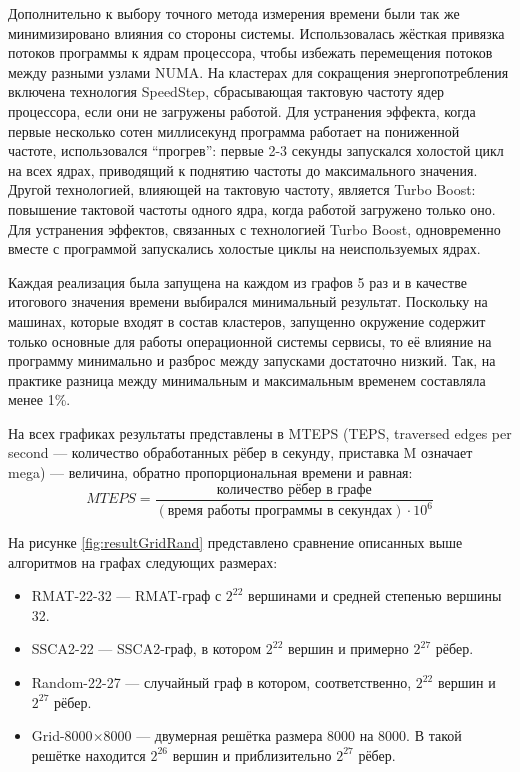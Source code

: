\documentclass[a4paper,12pt]{extarticle}
\begin{document}
Дополнительно к выбору точного метода измерения времени были так же минимизировано влияния со стороны системы. 
Использовалась жёсткая привязка потоков программы к ядрам процессора, чтобы избежать перемещения потоков между разными узлами NUMA.
На кластерах для сокращения энергопотребления включена технология SpeedStep, сбрасывающая тактовую частоту ядер процессора, если они не загружены работой. 
Для устранения эффекта, когда первые несколько сотен миллисекунд программа работает на пониженной частоте, использовался ``прогрев'': первые 2-3 секунды запускался холостой цикл на всех ядрах, приводящий к поднятию частоты до максимального значения.
Другой технологией, влияющей на тактовую частоту, является Turbo Boost: повышение тактовой частоты одного ядра, когда работой загружено только оно.
Для устранения эффектов, связанных с технологией Turbo Boost, одновременно вместе с программой запускались холостые циклы на неиспользуемых ядрах.

Каждая реализация была запущена на каждом из графов 5 раз и в качестве итогового значения времени выбирался минимальный результат.
Поскольку на машинах, которые входят в состав кластеров, запущенно окружение содержит только основные для работы операционной системы сервисы, то её влияние на программу минимально и разброс между запусками достаточно низкий.
Так, на практике разница между минимальным и максимальным временем составляла менее 1\%.

На всех графиках результаты представлены в MTEPS (TEPS, traversed edges per second --- количество обработанных рёбер в секунду, приставка M означает mega) --- величина, обратно пропорциональная времени и равная:
$$MTEPS = \frac{\texttt{количество рёбер в графе}}{(\texttt{время работы программы в секундах}) \cdot 10^6}$$

На рисунке \ref{fig:resultGridRand} представлено сравнение описанных выше алгоритмов на графах следующих размерах:
\begin{itemize}
    \item RMAT-22-32 --- RMAT-граф с $2^{22}$ вершинами и средней степенью вершины 32.
    \item SSCA2-22 --- SSCA2-граф, в котором $2^{22}$ вершин и примерно $2^{27}$ рёбер.
    \item Random-22-27 --- случайный граф в котором, соответственно, $2^{22}$ вершин и $2^{27}$ рёбер.
    \item Grid-8000$\times$8000 --- двумерная решётка размера 8000 на 8000. В такой решётке находится $2^{26}$ вершин и приблизительно $2^{27}$ рёбер.
\end{itemize}
\end{document}
